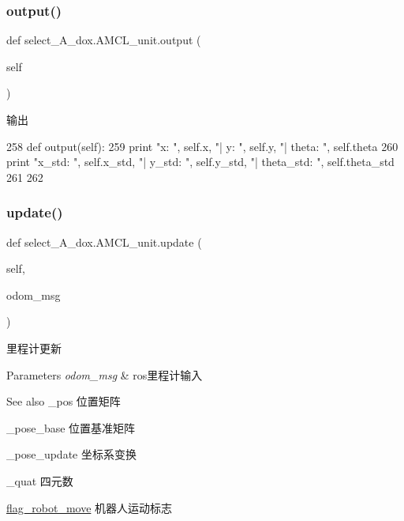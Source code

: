 \subsubsection{\texorpdfstring{output()}{output()}}
{\footnotesize\ttfamily def select\+\_\+\+A\+\_\+dox.\+A\+M\+C\+L\+\_\+unit.\+output (\begin{DoxyParamCaption}\item[{}]{self }\end{DoxyParamCaption})}



输出 


\begin{DoxyCode}
258     \textcolor{keyword}{def }output(self):
259         \textcolor{keywordflow}{print} \textcolor{stringliteral}{"x: "}, self.x, \textcolor{stringliteral}{"| y: "}, self.y, \textcolor{stringliteral}{"| theta: "}, self.theta
260         \textcolor{keywordflow}{print} \textcolor{stringliteral}{"x\_std: "}, self.x\_std, \textcolor{stringliteral}{"| y\_std: "}, self.y\_std, \textcolor{stringliteral}{"| theta\_std: "}, self.theta\_std
261 
262 
\end{DoxyCode}
\mbox{\label{classselect___a__dox_1_1_a_m_c_l__unit_a9c81d73d5e22dc32abd7678cf7f70cc9}} 
\subsubsection{\texorpdfstring{update()}{update()}}
{\footnotesize\ttfamily def select\+\_\+\+A\+\_\+dox.\+A\+M\+C\+L\+\_\+unit.\+update (\begin{DoxyParamCaption}\item[{}]{self,  }\item[{}]{odom\+\_\+msg }\end{DoxyParamCaption})}



里程计更新 


\begin{DoxyParams}{Parameters}
{\em odom\+\_\+msg} & ros里程计输入\\
\hline
\end{DoxyParams}
\begin{DoxySeeAlso}{See also}
\+\_\+pos 位置矩阵 

\+\_\+pose\+\_\+base 位置基准矩阵 

\+\_\+pose\+\_\+update 坐标系变换 

\+\_\+quat 四元数 

\hyperlink{namespaceselect___a__dox_aab650782f9bf9e653748df1ce43ba0a3}{flag\+\_\+robot\+\_\+move} 机器人运动标志 
\end{DoxySeeAlso}

